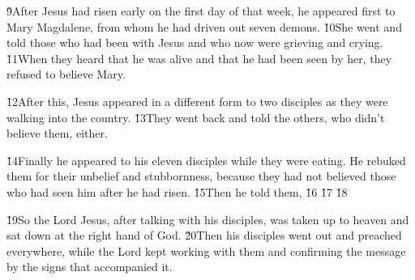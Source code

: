 \v{9}After Jesus had risen early on the first day of that week, he appeared first to Mary Magdalene, from whom he had driven out seven demons. \v{10}She went and told those who had been with Jesus and who now were grieving and crying. \v{11}When they heard that he was alive and that he had been seen by her, they refused to believe Mary.

\v{12}After this, Jesus appeared in a different form to two disciples as they were walking into the country. \v{13}They went back and told the others, who didn't believe them, either.

\v{14}Finally he appeared to his eleven disciples while they were eating. He rebuked them for their unbelief and stubbornness, because they had not believed those who had seen him after he had risen. \v{15}Then he told them,  \v{16} \v{17} \red{,} \v{18}\red{,}\red{, }

\v{19}So the Lord Jesus, after talking with his disciples, was taken up to heaven and sat down at the right hand of God. \v{20}Then his disciples went out and preached everywhere, while the Lord kept working with them and confirming the message by the signs that accompanied it.
